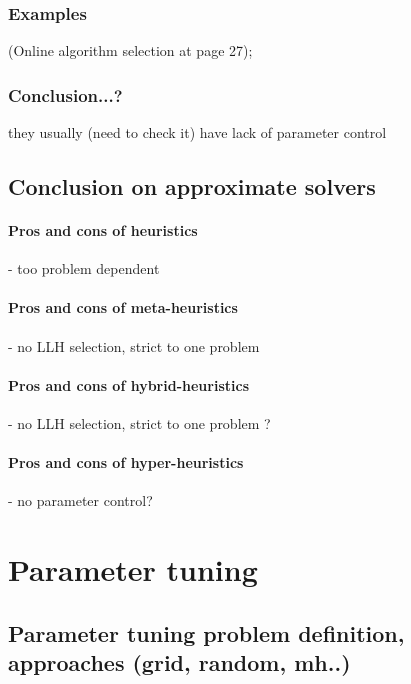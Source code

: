 \subsubsection{Examples}%
\cite{surv:drake2019recent} (Online algorithm selection at page 27); \cite{surv:kerschke2019automated}
\subsubsection{Conclusion...?} they usually (need to check it) have lack of parameter control

\subsection{Conclusion on approximate solvers}
\paragraph{Pros and cons of heuristics} - too problem dependent
\paragraph{Pros and cons of meta-heuristics} - no LLH selection, strict to one problem
\paragraph{Pros and cons of hybrid-heuristics} - no LLH selection, strict to one problem ? 
\paragraph{Pros and cons of hyper-heuristics} - no parameter control?


\section{Parameter tuning}\label{bg: parameter tuning}

\subsection{Parameter tuning problem definition, approaches (grid, random, mh..)}

